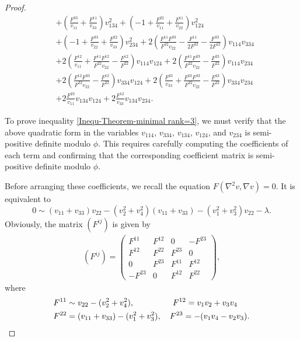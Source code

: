 \documentclass[11pt]{amsart}
\numberwithin{theorem}{section}
\numberwithin{equation}{section}
\begin{document}
\begin{proof}
\begin{align*}
&+\left(\frac{F^{33}}{v_{11}}+\frac{F^{11}}{v_{33}}\right)v_{134}^2+\left(-1+\frac{F^{22}}{v_{11}}+\frac{F^{11}}{v_{22}}\right)v_{124}^2\\
&+\left(-1+\frac{F^{33}}{v_{22}}+\frac{F^{22}}{v_{33}}\right)v_{234}^2+2\left(\frac{F^{11}F^{33}}{F^{22}v_{22}}-\frac{F^{11}}{2F^{22}}-\frac{F^{33}}{2F^{22}}\right)v_{114}v_{334}\\
&+2\left(\frac{F^{12}}{v_{11}}+\frac{F^{11}F^{12}}{F^{22}v_{22}}-\frac{F^{12}}{F^{22}}\right)v_{114}v_{124}+2\left(\frac{F^{11}F^{23}}{F^{22}v_{22}}-\frac{F^{23}}{F^{22}}\right)v_{114}v_{234}\\
&+2\left(\frac{F^{12}F^{33}}{F^{22}v_{22}}-\frac{F^{12}}{F^{22}}\right)v_{334}v_{124}+2\left(\frac{F^{23}}{v_{33}}+\frac{F^{23}F^{33}}{F^{22}v_{22}}-\frac{F^{23}}{F^{22}}\right)v_{334}v_{234}\\
&+2\frac{F^{23}}{v_{11}}v_{134}v_{124}+2\frac{F^{12}}{v_{33}}v_{134}v_{234}.
\end{align*}
 
To prove inequality \eqref{Inequ-Theorem-minimal rank=3}, we must verify that the above quadratic form in the variables $v_{114}$, $v_{334}$, $v_{134}$, $v_{124}$, and $v_{234}$ is semi-positive definite modulo $\phi$. This requires carefully computing the coefficients of each term and confirming that the corresponding coefficient matrix is semi-positive definite modulo $\phi$.
 
Before arranging these coefficients, we recall the equation $F(\nabla^2v, \nabla v)=0$. It is equivalent to
\begin{equation}\label{Relation-Equation-3}
0\sim (v_{11}+v_{33})v_{22}-(v_2^2+v_4^2)(v_{11}+v_{33})-(v_1^2+v_3^2)v_{22} -\lambda.
\end{equation}
Obviously, the matrix $(F^{ij})$ is given by
\begin{align}\label{Relation-Fij-a}
(F^{ij})=\begin{pmatrix}
F^{11} & F^{12} & 0 & -F^{23}\\[4pt]
F^{12} & F^{22} & F^{23} & 0\\[4pt]
0 & F^{23} & F^{11} & F^{12}\\[4pt]
-F^{23} & 0 & F^{12} & F^{22}
\end{pmatrix},
\end{align}
where
\begin{equation}\label{Relation-Fij-b}
\begin{aligned}
&F^{11}\sim v_{22}-(v_2^2+v_4^2), \hspace{1.65cm} F^{12}=v_1v_2+v_3v_4\\
&F^{22}=(v_{11}+v_{33})-(v_1^2+v_3^2), \quad F^{23}=-(v_1v_4-v_2v_3).
\end{aligned}
\end{equation}
 

\end{proof}
\end{document}
